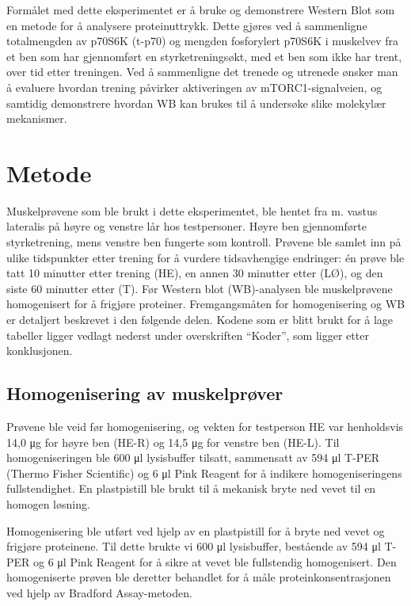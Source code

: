 \documentclass[
  letterpaper,
  DIV=11,
  numbers=noendperiod]{scrreprt}
\begin{document}
Formålet med dette eksperimentet er å bruke og demonstrere Western Blot
som en metode for å analysere proteinuttrykk. Dette gjøres ved å
sammenligne totalmengden av p70S6K (t-p70) og mengden fosforylert p70S6K
i muskelvev fra et ben som har gjennomført en styrketreningsøkt, med et
ben som ikke har trent, over tid etter treningen. Ved å sammenligne det
trenede og utrenede ønsker man å evaluere hvordan trening påvirker
aktiveringen av mTORC1-signalveien, og samtidig demonstrere hvordan WB
kan brukes til å undersøke slike molekylær mekanismer.

\section{Metode}\label{metode-6}

Muskelprøvene som ble brukt i dette eksperimentet, ble hentet fra m.
vastus lateralis på høyre og venstre lår hos testpersoner. Høyre ben
gjennomførte styrketrening, mens venstre ben fungerte som kontroll.
Prøvene ble samlet inn på ulike tidspunkter etter trening for å vurdere
tidsavhengige endringer: én prøve ble tatt 10 minutter etter trening
(HE), en annen 30 minutter etter (LØ), og den siste 60 minutter etter
(T). Før Western blot (WB)-analysen ble muskelprøvene homogenisert for å
frigjøre proteiner. Fremgangsmåten for homogenisering og WB er detaljert
beskrevet i den følgende delen. Kodene som er blitt brukt for å lage
tabeller ligger vedlagt nederst under overskriften ``Koder'', som ligger
etter konklusjonen.

\subsection{Homogenisering av
muskelprøver}\label{homogenisering-av-muskelpruxf8ver}

Prøvene ble veid før homogenisering, og vekten for testperson HE var
henholdsvis 14,0 μg for høyre ben (HE-R) og 14,5 μg for venstre ben
(HE-L). Til homogeniseringen ble 600 μl lysisbuffer tilsatt, sammensatt
av 594 μl T-PER (Thermo Fisher Scientific) og 6 μl Pink Reagent for å
indikere homogeniseringens fullstendighet. En plastpistill ble brukt til
å mekanisk bryte ned vevet til en homogen løsning.

Homogenisering ble utført ved hjelp av en plastpistill for å bryte ned
vevet og frigjøre proteinene. Til dette brukte vi 600 μl lysisbuffer,
bestående av 594 μl T-PER og 6 μl Pink Reagent for å sikre at vevet ble
fullstendig homogenisert. Den homogeniserte prøven ble deretter
behandlet for å måle proteinkonsentrasjonen ved hjelp av Bradford
Assay-metoden.
\end{document}
